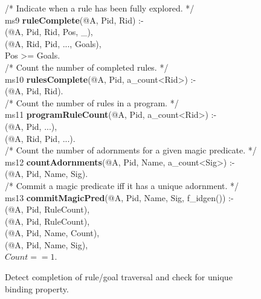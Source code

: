 \begin{figure}[!t]
\ssp
\centering
\begin{boxedminipage}{\linewidth}
/* Indicate when a rule has been fully explored. */ \\
ms9 {\bf ruleComplete}(@A, Pid, Rid) :- \\
(@A, Pid, Rid, Pos, \_), \\
(@A, Rid, Pid, ..., Goals), \\
\datalogspace Pos >= Goals. \\
	       
/* Count the number of completed rules. */ \\
ms10 {\bf rulesComplete}(@A, Pid, a\_count<Rid>) :- \\
(@A, Pid, Rid). \\
	        
/* Count the number of rules in a program. */ \\
ms11 {\bf programRuleCount}(@A, Pid, a\_count<Rid>) :- \\
(@A, Pid, ...), \\
(@A, Rid, Pid, ...). \\
	
/* Count the number of adornments for a given magic predicate. */ \\
ms12 {\bf countAdornments}(@A, Pid, Name, a\_count<Sig>) :- \\
(@A, Pid, Name, Sig). \\
	       
/* Commit a magic predicate iff it has a unique adornment. */ \\
ms13 {\bf commitMagicPred}(@A, Pid, Name, Sig, f\_idgen()) :- \\
(@A, Pid, RuleCount), \\
(@A, Pid, RuleCount), \\
(@A, Pid, Name, Count), \\
(@A, Pid, Name, Sig), \\
\datalogspace $Count == 1$.
\end{boxedminipage}
\caption{\label{ch:evita:fig:mpgoal}Detect completion of rule/goal traversal and check for unique binding property.}
\end{figure}


